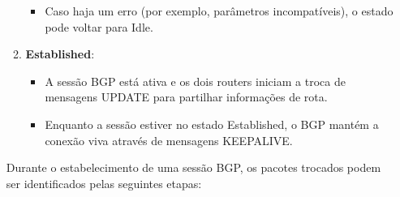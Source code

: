 \documentclass[11pt,english, openright, oneside]{book}
\begin{document}
\begin{enumerate}
\begin{enumerate}
\begin{itemize}
      \item Caso haja um erro (por exemplo, parâmetros incompatíveis), o estado pode voltar para Idle.
    \end{itemize}
    \item \textbf{Established}:
    \begin{itemize}
      \item A sessão BGP está ativa e os dois routers iniciam a troca de mensagens UPDATE para partilhar informações de rota.
      \item Enquanto a sessão estiver no estado Established, o BGP mantém a conexão viva através de mensagens KEEPALIVE.
    \end{itemize}
  \end{enumerate}

  \vspace{0.2cm}
  Durante o estabelecimento de uma sessão BGP, os pacotes trocados podem ser identificados pelas seguintes etapas:


\end{enumerate}
\end{document}

